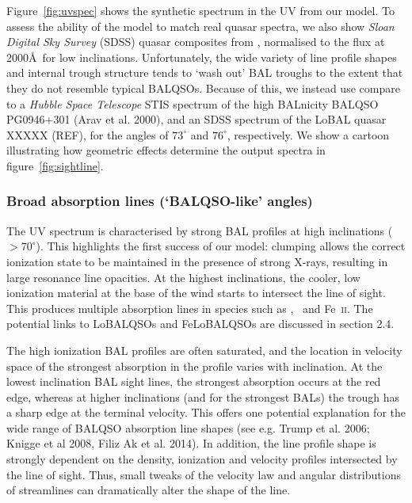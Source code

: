 \documentclass[useAMS,usenatbib]{mn2e_x}
\begin{document}
Figure~\ref{fig:uvspec} shows the synthetic spectrum in the UV from our model. 
To assess the ability of the model to match real 
quasar spectra, we also show {\sl Sloan Digital Sky Survey} (SDSS) quasar
composites from \cite{reichard2003}, normalised to the flux at 2000\AA\
for low inclinations. Unfortunately, the wide variety of
line profile shapes and internal trough structure 
tends to `wash out' BAL troughs to the extent that they do not 
resemble typical BALQSOs.
Because of this, we instead use compare to a {\sl Hubble Space Telescope} 
STIS spectrum of the high BALnicity BALQSO PG0946+301 (Arav et al. 2000),
and an SDSS spectrum of the LoBAL quasar XXXXX (REF),
for the angles of $73^\circ$ and $76^\circ$, respectively. 
We show a cartoon illustrating how geometric effects determine
the output spectra in figure~\ref{fig:sightline}.  

\subsubsection{Broad absorption lines (`BALQSO-like' angles)}

The UV spectrum is characterised by strong BAL 
profiles at high inclinations ($> 70^\circ$). 
This highlights the first success of our model: 
clumping allows the correct ionization state 
to be maintained in the presence of strong X-rays, 
resulting in large resonance line opacities. 
At the highest inclinations, the 
cooler, low ionization material at the base of the wind
starts to intersect the line of sight. This produces 
multiple absorption lines in species such as \mg,
\al\ and Fe~\textsc{ii}. The potential links to LoBALQSOs and 
FeLoBALQSOs are discussed in section 2.4.

The high ionization BAL profiles are often saturated, and the location in velocity space
of the strongest absorption in the profile varies with inclination.
At the lowest inclination BAL sight lines, the strongest absorption occurs at the red edge,
whereas at higher inclinations (and for the strongest BALs)
the trough has a sharp edge at the terminal velocity.
This offers one potential explanation for the wide range of BALQSO absorption
line shapes (see e.g. Trump et al. 2006; Knigge et al 2008, Filiz Ak et al. 2014).
In addition, the line profile shape is strongly dependent 
on the density, ionization and velocity 
profiles intersected by the line of sight. Thus, small tweaks of the velocity
law and angular distributions of streamlines can dramatically alter
the shape of the line.
\end{document}
